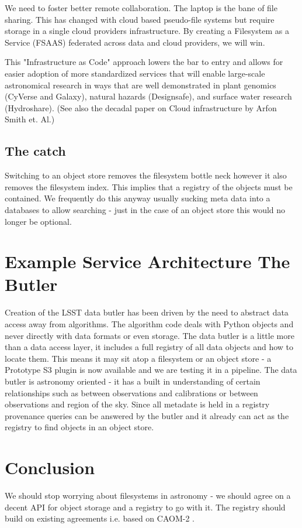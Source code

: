 We need to foster better remote collaboration.  The laptop is the bane of file sharing.
This has changed with cloud based pseudo-file systems but require storage in a single
cloud providers infrastructure. By creating a Filesystem as a Service (\gls{FSAAS}) federated
across data and cloud providers, we will win.


This "Infrastructure as Code" \citep{morris2016infrastructure} approach lowers the bar to entry
and allows for easier adoption of more standardized services that will enable large-scale
astronomical research in ways that are well demonstrated in plant genomics (CyVerse and Galaxy), natural hazards (Designsafe), and surface water research (Hydroshare). (See also the decadal paper on Cloud infrastructure by Arfon Smith et. Al.)

\subsection{The catch }
Switching to an object store removes the filesystem bottle neck however it also removes the filesystem index. This implies that a registry of the objects must be contained. We frequently do this anyway usually sucking meta data into a databases to allow searching - just in the case of an object store this would no longer be  optional.

\section{Example Service Architecture The Butler}
Creation of the LSST data butler \citep{2018arXiv181208085J} has been driven by the need to abstract data access away from algorithms.
The algorithm code deals with Python objects and never directly with data formats or even storage. The data butler is a little more than a data access layer, it includes a full registry of all data objects and how to locate them. This means it may sit atop a filesystem or an object store - a Prototype S3 plugin is now available and we are testing it in a pipeline.  The data butler is astronomy oriented - it has a built in understanding of certain relationships such as between observations and calibrations or between observations and region of the sky. Since all metadate is held in a registry provenance queries can be answered by the butler and it already can act as the registry to find objects in an object store.

\section{Conclusion}
We should stop worrying about filesystems in astronomy - we should agree on a decent API for object storage and a registry to go with it.
The registry should build on existing agreements i.e. based on CAOM-2 \citep{2007ASPC..376..347D}.
